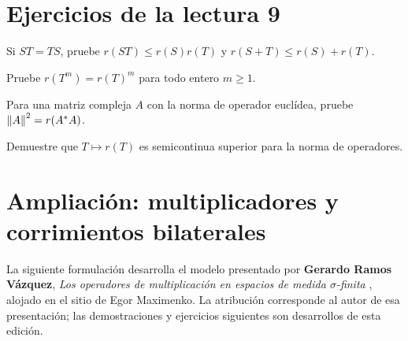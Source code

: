 \section{Ejercicios de la lectura 9}
\begin{ejercicio}\label{ej:v3-l09-1}
Si $ST=TS$, pruebe $r(ST)\le r(S)r(T)$ y $r(S+T)\le r(S)+r(T)$.
\end{ejercicio}


\begin{ejercicio}\label{ej:v3-l09-2}
Pruebe $r(T^m)=r(T)^m$ para todo entero $m\ge1$.
\end{ejercicio}


\begin{ejercicio}\label{ej:v3-l09-3}
Para una matriz compleja $A$ con la norma de operador euclídea, pruebe $\left\lVert A\right\rVert^2=r(A^*A)$.
\end{ejercicio}


\begin{ejercicio}\label{ej:v3-l09-4}
Demuestre que $T\mapsto r(T)$ es semicontinua superior para la norma de operadores.
\end{ejercicio}


\section{Ampliación: multiplicadores y corrimientos bilaterales}
La siguiente formulación desarrolla el modelo presentado por \textbf{Gerardo Ramos Vázquez}, \emph{Los operadores de multiplicación en espacios de medida $\sigma$-finita} \cite{ramos2018}, alojado en el sitio de Egor Maximenko. La atribución corresponde al autor de esa presentación; las demostraciones y ejercicios siguientes son desarrollos de esta edición.

